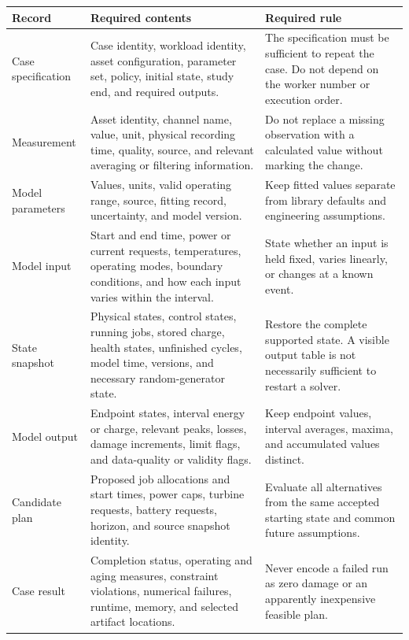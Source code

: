 \documentclass[11pt,a4paper]{report}
\begin{document}
\begin{longtable}{L{0.18\textwidth}L{0.35\textwidth}L{0.35\textwidth}}
\toprule Record & Required contents & Required rule \\ \midrule\endhead
Case specification & Case identity, workload identity, asset configuration, parameter set, policy, initial state, study end, and required outputs. & The specification must be sufficient to repeat the case. Do not depend on the worker number or execution order. \\
Measurement & Asset identity, channel name, value, unit, physical recording time, quality, source, and relevant averaging or filtering information. & Do not replace a missing observation with a calculated value without marking the change. \\
Model parameters & Values, units, valid operating range, source, fitting record, uncertainty, and model version. & Keep fitted values separate from library defaults and engineering assumptions. \\
Model input & Start and end time, power or current requests, temperatures, operating modes, boundary conditions, and how each input varies within the interval. & State whether an input is held fixed, varies linearly, or changes at a known event. \\
State snapshot & Physical states, control states, running jobs, stored charge, health states, unfinished cycles, model time, versions, and necessary random-generator state. & Restore the complete supported state. A visible output table is not necessarily sufficient to restart a solver. \\
Model output & Endpoint states, interval energy or charge, relevant peaks, losses, damage increments, limit flags, and data-quality or validity flags. & Keep endpoint values, interval averages, maxima, and accumulated values distinct. \\
Candidate plan & Proposed job allocations and start times, power caps, turbine requests, battery requests, horizon, and source snapshot identity. & Evaluate all alternatives from the same accepted starting state and common future assumptions. \\
Case result & Completion status, operating and aging measures, constraint violations, numerical failures, runtime, memory, and selected artifact locations. & Never encode a failed run as zero damage or an apparently inexpensive feasible plan. \\
\bottomrule
\end{longtable}
\end{document}
